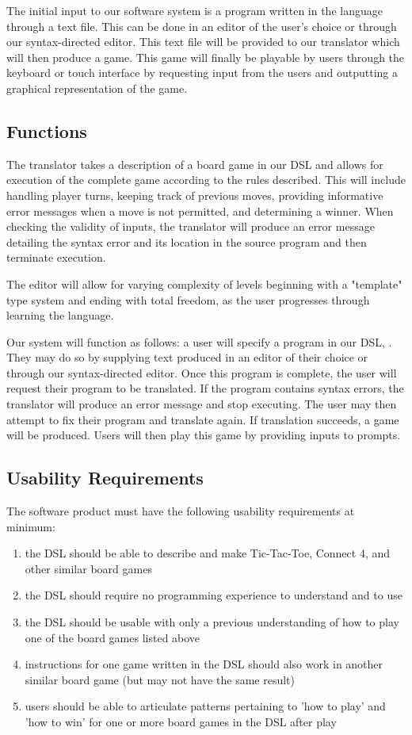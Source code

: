 \documentclass[10pt,letter,draftclsnofoot,onecolumn]{IEEEtran}
\begin{document}
\begin{singlespace}
        The initial input to our software system is a program written in the language \name through a text file. This can be done in an editor of the user's choice or through our syntax-directed editor. This text file will be provided to our translator which will then produce a game. This game will finally be playable by users through the keyboard or touch interface by requesting input from the users and outputting a graphical representation of the game. 
        
    \subsection{Functions}
        The translator takes a description of a board game in our DSL and allows for execution of the complete game according to the rules described. This will include handling player turns, keeping track of previous moves, providing informative error messages when a move is not permitted, and determining a winner. When checking the validity of inputs, the translator will produce an error message detailing the syntax error and its location in the source program and then terminate execution. 
        
        The editor will allow for varying complexity of levels beginning with a "template" type system and ending with total freedom, as the user progresses through learning the language. 
        
        Our system will function as follows: a user will specify a program in our DSL, \name. They may do so by supplying text produced in an editor of their choice or through our syntax-directed editor. Once this program is complete, the user will request their program to be translated. If the program contains syntax errors, the translator will produce an error message and stop executing. The user may then attempt to fix their program and translate again. If translation succeeds, a game will be produced. Users will then play this game by providing inputs to prompts.
        
    \subsection{Usability Requirements}
        The software product must have the following usability requirements at minimum:
        \begin{enumerate}
            \item the DSL should be able to describe and make Tic-Tac-Toe, Connect 4, and other similar board games
	        \item the DSL should require no programming experience to understand and to use
	        \item the DSL should be usable with only a previous understanding of how to play one of the board games listed above
	        \item instructions for one game written in the DSL should also work in another similar board game (but may not have the same result)
	        \item users should be able to articulate patterns pertaining to 'how to play' and 'how to win' for one or more board games in the DSL after play
        \end{enumerate}

\end{singlespace}
\end{document}

